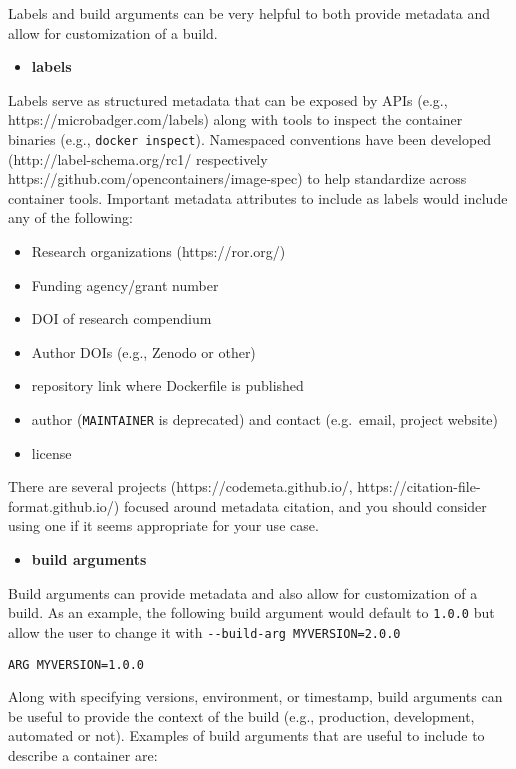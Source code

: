 \documentclass[10pt,letterpaper]{article}
\providecommand{\tightlist}{%
  \setlength{\itemsep}{0pt}\setlength{\parskip}{0pt}}
\begin{document}
Labels and build arguments can be very helpful to both provide metadata
and allow for customization of a build.

\begin{itemize}
\tightlist
\item
  \textbf{labels}
\end{itemize}

Labels serve as structured metadata that can be exposed by APIs (e.g.,
https://microbadger.com/labels) along with tools to inspect the
container binaries (e.g., \texttt{docker\ inspect}). Namespaced
conventions have been developed (http://label-schema.org/rc1/
respectively https://github.com/opencontainers/image-spec) to help
standardize across container tools. Important metadata attributes to
include as labels would include any of the following:

\begin{itemize}
\tightlist
\item
  Research organizations (https://ror.org/)
\item
  Funding agency/grant number
\item
  DOI of research compendium
\item
  Author DOIs (e.g., Zenodo or other)
\item
  repository link where Dockerfile is published
\item
  author (\texttt{MAINTAINER} is deprecated) and contact (e.g.~email,
  project website)
\item
  license
\end{itemize}

There are several projects (https://codemeta.github.io/,
https://citation-file-format.github.io/) focused around metadata
citation, and you should consider using one if it seems appropriate for
your use case.

\begin{itemize}
\tightlist
\item
  \textbf{build arguments}
\end{itemize}

Build arguments can provide metadata and also allow for customization of
a build. As an example, the following build argument would default to
\texttt{1.0.0} but allow the user to change it with
\texttt{-\/-build-arg\ MYVERSION=2.0.0}

\begin{verbatim}
ARG MYVERSION=1.0.0
\end{verbatim}

Along with specifying versions, environment, or timestamp, build
arguments can be useful to provide the context of the build (e.g.,
production, development, automated or not). Examples of build arguments
that are useful to include to describe a container are:
\end{document}
